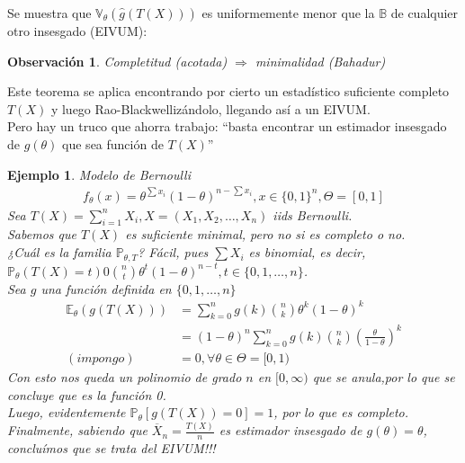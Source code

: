\documentclass[10pt]{article}
\theoremstyle{plain}
\newtheorem{obs}{Observación}
\newtheorem{ej}{Ejemplo}
\theoremstyle{definition}
\begin{document}
Se muestra que $\mathbb{V}_{\theta}(\hat{g}(T(X)))$ es uniformemente menor que la $\mathbb{B}$ de cualquier otro insesgado (EIVUM):

\begin{obs}
Completitud (acotada) $\Rightarrow$ minimalidad (Bahadur)
\end{obs}

Este teorema se aplica encontrando por cierto un estadístico suficiente completo $T(X)$ y luego Rao-Blackwellizándolo, llegando así a un EIVUM.\\
Pero hay un truco que ahorra trabajo: ``basta encontrar un estimador insesgado de $g(\theta)$ que sea función de $T(X)$''

\begin{ej} Modelo de Bernoulli\\
\begin{align*}
f_{\theta}(x) = \theta^{\sum x_{i}}(1-\theta)^{n-\sum x_{i}}, x \in \{0,1\}^n, \Theta = \left[0,1\right]
\end{align*}
Sea $T(X) = \sum_{i=1}^n X_{i}, X = (X_{1},X_{2},\ldots,X_{n})$ iids Bernoulli.\\
Sabemos que $T(X)$ es suficiente minimal, pero no si es completo o no.\\
¿Cuál es la familia $\mathbb{P}_{\theta,T}$? Fácil, pues $\sum X_{i}$ es binomial, es decir, $\mathbb{P}_{\theta}(T(X)=t) 0 \binom{n}{t} \theta^t (1-\theta)^{n-t}, t \in \{0,1,\ldots,n\}$.\\
Sea $g$ una función definida en $\{0,1,\ldots,n\}$
\begin{align*}
\mathbb{E}_{\theta}(g(T(X))) &= \sum_{k=0}^n g(k) \binom{n}{k} \theta^k(1-\theta)^k\\
&=(1-\theta)^n \sum_{k=0}^n g(k) \binom{n}{k} (\frac{\theta}{1-\theta})^k\\
(impongo)\ &= 0, \forall \theta \in \Theta = [0,1)
\end{align*}
Con esto nos queda un polinomio de grado $n$ en $[0,\infty)$ que se anula,por lo que se concluye que es la función 0.\\
Luego, evidentemente $\mathbb{P}_{\theta}[g(T(X))=0] = 1$, por lo que es completo.\\
Finalmente, sabiendo que $\overline{X}_{n} = \frac{T(X)}{n}$ es estimador insesgado de $g(\theta) = \theta$, concluímos que se trata del EIVUM!!!
\end{ej}
\end{document}
